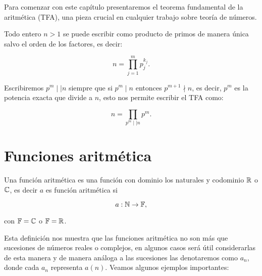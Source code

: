 
\thispagestyle{empty}
\vspace{-0.7cm}


Para comenzar con este capítulo presentaremos el teorema fundamental de la aritmética (TFA), una pieza crucial en cualquier trabajo sobre teoría de números.\\


\begin{theorem}[TFA]
Todo entero $n>1$ se puede escribir como producto de primos de manera única salvo el orden de los factores, es decir:

$$n=\prod_{j=1}^{m}p_j^{k_j}.$$
\end{theorem}

Escribiremos $p^m\mid\mid n$ siempre que si $p^m\mid n$ entonces $p^{m+1}\nmid n$, es decir, $p^m$ es la potencia exacta que divide a $n$, esto nos permite escribir el TFA como:

$$n= \prod_{p^m\mid\mid n}p^m.$$

\section{Funciones aritmética}

\begin{definition}
Una función aritmética es una función con dominio los naturales y codominio $\mathbb{R}$ o $\mathbb{C}$, es decir $a$ es función aritmética si

$$a:\mathbb{N} \to \mathbb{F},$$

con $\mathbb{F}=\mathbb{C}$ o $\mathbb{F}=\mathbb{R}$.
\end{definition}

Esta definición nos muestra que las funciones aritmética no son más que sucesiones de números reales o complejos, en algunos casos será útil considerarlas de esta  manera y de manera análoga a  las sucesiones las denotaremos como $a_n$, donde cada $a_n$ representa $a(n)$. Veamos algunos ejemplos importantes:


